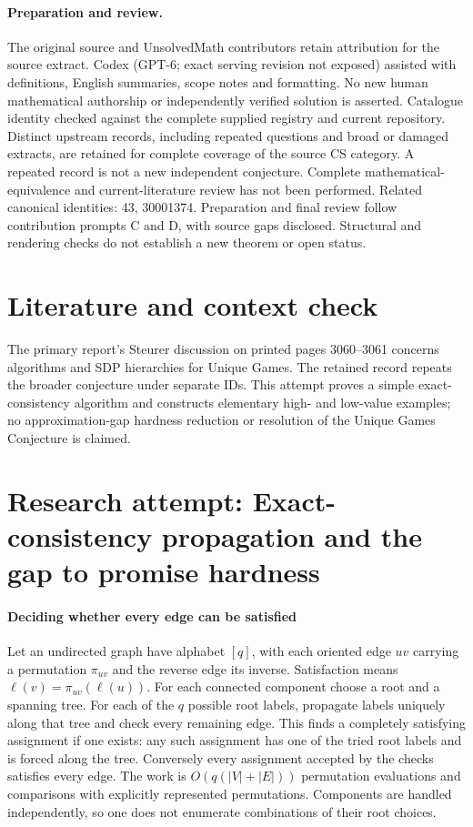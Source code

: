 \documentclass[11pt]{article}
\begin{document}
\paragraph{Preparation and review.}
The original source and UnsolvedMath contributors retain attribution for the source extract. Codex (GPT-6; exact serving revision not exposed) assisted with definitions, English summaries, scope notes and formatting. No new human mathematical authorship or independently verified solution is asserted. Catalogue identity checked against the complete supplied registry and current repository. Distinct upstream records, including repeated questions and broad or damaged extracts, are retained for complete coverage of the source CS category. A repeated record is not a new independent conjecture. Complete mathematical-equivalence and current-literature review has not been performed. Related canonical identities: 43, 30001374. Preparation and final review follow contribution prompts C and D, with source gaps disclosed. Structural and rendering checks do not establish a new theorem or open status.
\label{end:statement}

\section{Literature and context check}
The primary report's Steurer discussion on printed pages 3060--3061 concerns algorithms and SDP hierarchies for Unique Games. The retained record repeats the broader conjecture under separate IDs. This attempt proves a simple exact-consistency algorithm and constructs elementary high- and low-value examples; no approximation-gap hardness reduction or resolution of the Unique Games Conjecture is claimed.
\section{Research attempt: Exact-consistency propagation and the gap to promise hardness}

\paragraph{Deciding whether every edge can be satisfied}
Let an undirected graph have alphabet $[q]$, with each oriented edge $uv$ carrying a permutation $\pi_{uv}$ and the reverse edge its inverse. Satisfaction means $\ell(v)=\pi_{uv}(\ell(u))$. For each connected component choose a root and a spanning tree. For each of the $q$ possible root labels, propagate labels uniquely along that tree and check every remaining edge. This finds a completely satisfying assignment if one exists: any such assignment has one of the tried root labels and is forced along the tree. Conversely every assignment accepted by the checks satisfies every edge. The work is $O(q(|V|+|E|))$ permutation evaluations and comparisons with explicitly represented permutations. Components are handled independently, so one does not enumerate combinations of their root choices.
\end{document}
